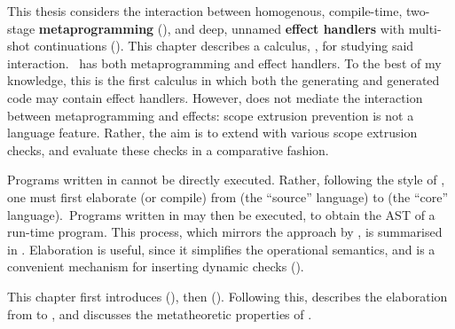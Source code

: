 This thesis considers the interaction between homogenous, compile-time, two-stage \textbf{metaprogramming} (), and deep, unnamed \textbf{effect handlers} with multi-shot continuations (). This chapter describes a calculus, \calculusName{}, for studying said interaction.\ \calculusName{} has both metaprogramming and effect handlers. To the best of my knowledge, this is the first calculus in which both the generating and generated code may contain effect handlers. However, \calculusName{} does not mediate the interaction between metaprogramming and effects: scope extrusion prevention is not a language feature. Rather, the aim is to extend \calculusName{} with various scope extrusion checks, and evaluate these checks in a comparative fashion. 

Programs written in \calculusName{} cannot be directly executed. Rather, following the style of \citet{xie-2023}, one must first elaborate (or compile) from \calculusName{} (the ``source'' language) to \coreLang{} (the ``core'' language).\, Programs written in \coreLang{} may then be executed, to obtain the AST of a run-time \efflang{} program. This process, which mirrors the approach by \citet{calcagno-2003}, is summarised in . Elaboration is useful, since it simplifies the operational semantics, and is a convenient mechanism for inserting dynamic checks (). 

This chapter first introduces \sourceLang{} (), then \coreLang{} (). Following this,  describes the elaboration from \sourceLang{} to \coreLang{}, and  discusses the metatheoretic properties of \calculusName{}. 

